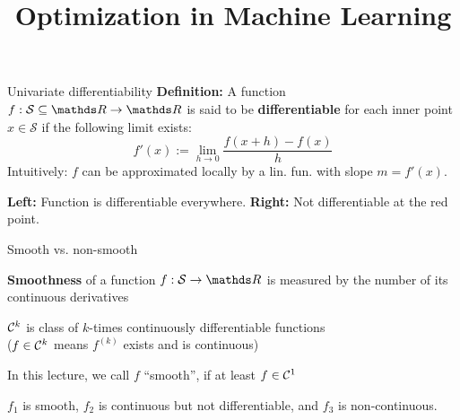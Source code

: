 \documentclass[11pt,compress,t,notes=noshow, xcolor=table]{beamer}
\title{Optimization in Machine Learning}
\begin{document}

\begin{framev}{Univariate differentiability}
\textbf{Definition:} A function $f: \mathcal{S} \subseteq \R \to \R$ is said to be \textbf{differentiable} for each inner point $x \in \mathcal{S}$ if the following limit exists:
$$
f'(x) := \lim_{h \to 0} \frac{f(x + h) - f(x)}{h}
$$
Intuitively: $f$ can be approximated locally by a lin. fun. with slope $m = f'(x)$.
\vfill
{}
\begin{center}
\begin{footnotesize}
\textbf{Left:} Function is differentiable everywhere.
\textbf{Right:} Not differentiable at the red point.
\end{footnotesize}
\end{center}
\end{framev}


\begin{framei}{Smooth vs. non-smooth}
\item \textbf{Smoothness} of a function $f: \mathcal{S} \to \R$ is measured by the number of its continuous derivatives
\item $\mathcal{C}^{k}$ is class of $k$-times continuously differentiable functions\\
($f\in\mathcal{C}^{k}$ means $f^{(k)}$ exists and is continuous)
\item In this lecture, we call $f$ ``smooth'', if at least $f \in \mathcal{C}^{1}$
\vfill
{}
\begin{center}
\begin{footnotesize}
$f_1$ is smooth, $f_2$ is continuous but not differentiable, and $f_3$ is non-continuous.
\end{footnotesize}
\end{center}
\end{framei}
\end{document}
